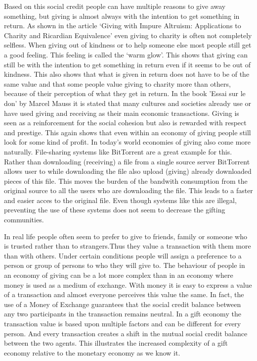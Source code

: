\documentclass[twoside,openright]{uva-bachelor-thesis}
\begin{document}
Based on this social credit people can have multiple reasons to give away something, but giving is almost always with the intention to get something in return. As shown in the article ‘Giving with Impure Altruism: Applications to Charity and Ricardian Equivalence’\cite{andreoni1989giving} even giving to charity is often not completely selfless. When giving out of kindness or to help someone else most people still get a good feeling. This feeling is called the ‘warm glow’\cite{andreoni1989giving}. This shows that giving can still be with the intention to get something in return even if it seems to be out of kindness. This also shows that what is given in return does not have to be of the same value and that some people value giving to charity more than others, because of their perception of what they get in return. In the book 'Essai sur le don' by Marcel Mauss it is stated that many cultures and societies already use or have used giving and receiving as their main economic transactions. Giving is seen as a reinforcement for the social cohesion but also is rewarded with respect and prestige. This again shows that even within an economy of giving people still look for some kind of profit. In today's world economies of giving also come more naturally. File-sharing systems like BitTorrent are a great example for this. Rather than downloading (receiving) a file from a single source server BitTorrent allows user to while downloading the file also upload (giving) already downloaded pieces of this file. This moves the burden of the bandwith consumption from the original source to all the users who are downloading the file. This leads to a faster and easier acces to the original file.\cite{ripeanu2006gifting} Even though systems like this are illegal, preventing the use of these systems does not seem to decrease the gifting communities.\cite{poort2014baywatch}

In real life people often seem to prefer to give to friends, family or someone who is trusted\cite{josang2007survey} rather than to strangers.Thus they value a transaction with them more than with others. Under certain conditions people will assign a preference to a person or group of persons to who they will give to. The behaviour of people in an economy of giving can be a lot more complex than in an economy where money is used as a medium of exchange. With money it is easy to express a value of a transaction and almost everyone perceives this value the same. In fact, the use of a Money of Exchange\cite{weijland2014mathematical} guarantees that the social credit balance between any two participants in the transaction remains neutral. In a gift economy the transaction value is based upon multiple factors and can be different for every person. And every transaction creates a shift in the mutual social credit balance between the two agents. This illustrates the increased complexity of a gift economy relative to the monetary economy as we know it.
\end{document}
